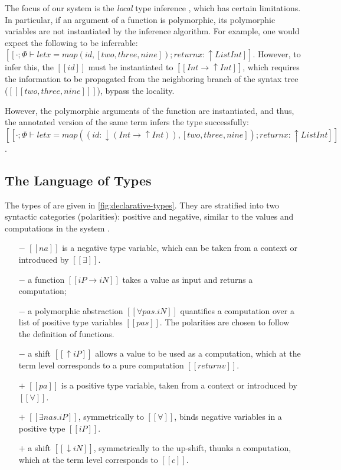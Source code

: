 The focus of our system is the \emph{local} type inference \cite{pierce2000:local},
which has certain limitations.
In particular, if an argument of a function is polymorphic,
its polymorphic variables are not instantiated by the inference algorithm. 
For example, one would expect the following to be inferrable:
$[[· ; Φ ⊢ let x = map(id, [two, three, nine]); return x : ↑ List Int]]$.
However, to infer this, the $[[id]]$ must be instantiated to $[[Int → ↑Int]]$, 
which requires the information to be propagated from the neighboring branch 
of the syntax tree ($[[ [two, three, nine] ]]$), \ie bypass the locality. 

However, the polymorphic arguments of the function are instantiated, 
and thus, the annotated version of the same term infers the type successfully:
$[[· ; Φ ⊢ let x = map((id : ↓(Int → ↑Int)), [two, three, nine]); return x : ↑ List Int]]$.


\subsection{The Language of Types}

The types of \fexists are given in \cref{fig:declarative-types}.
They are stratified into two syntactic 
categories (polarities): positive and negative,  
similar to the values and computations in the \CBPV system \cite{levy2006:cbpv}.
\begin{itemize}
\item [$-$] $[[na]]$ is a negative type variable, which can be taken from a context or introduced by $[[∃]]$.
\item [$-$] a function $[[iP → iN]]$ takes a value as input and returns a computation; 
\item [$-$] a polymorphic abstraction $[[∀pas.iN]]$ quantifies a computation over
  a list of positive type variables 
  $[[pas]]$. The polarities are chosen to follow the definition of functions.
\item [$-$] a shift $[[↑iP]]$ allows a value to be used as a computation, 
  which at the term level corresponds to a pure computation $[[return v]]$.
\item [$+$] $[[pa]]$ is a positive type variable, taken from a context or introduced by $[[∀]]$.
\item [$+$] $[[∃nas.iP]]$, symmetrically to $[[∀]]$, 
  binds negative variables in a positive type $[[iP]]$. 
\item [$+$] a shift $[[↓iN]]$, symmetrically to the up-shift, 
  thunks a computation, which at the term level corresponds to $[[ {c} ]]$.
\end{itemize}

